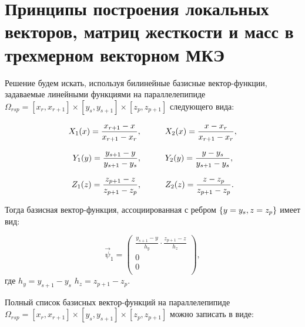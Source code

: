 \section{Принципы построения локальных векторов, матриц жесткости и масс в трехмерном векторном МКЭ}

Решение будем искать, используя билинейные базисные вектор-функции, задаваемые линейными функциями на параллелепипиде $\Omega_{rsp} = [x_r, x_{r+1}] \times [y_s, y_{s+1}] \times [z_p, z_{p+1}]$ следующего вида:

\begin{equation} \label{eq_1_12}
	X_1(x) = \frac{x_{r + 1} - x}{x_{r + 1} - x_r}, \hspace{10mm} X_2(x) = \frac{x - x_r}{x_{r + 1} - x_r},
\end{equation}

\begin{equation} \label{eq_1_13}
	Y_1(y) = \frac{y_{s + 1} - y}{y_{s + 1} - y_s}, \hspace{10mm} Y_2(y) = \frac{y - y_s}{y_{s + 1} - y_s},
\end{equation}

\begin{equation} \label{eq_1_14}
	Z_1(z) = \frac{z_{p + 1} - z}{z_{p + 1} - z_p}, \hspace{10mm} Z_2(z) = \frac{z - z_p}{z_{p + 1} - z_p}.
\end{equation}

Тогда базисная вектор-функция, ассоциированная с ребром $\{y = y_s,\\ z = z_p\}$ имеет вид:

\begin{equation*}
	\overrightarrow{\psi}_1 = \left(
	\begin{array}{c}
		\frac{y_{s + 1} - y}{h_y} \cdot \frac{z_{p + 1} - z}{h_z}\\
		0\\
		0\\
	\end{array}
	\right),
\end{equation*}
где $h_y = y_{s + 1} - y_s$ $h_z = z_{p + 1} - z_p$.

Полный список базисных вектор-функций на параллелепипиде $\Omega_{rsp} = [x_r, x_{r+1}] \times [y_s, y_{s+1}] \times [z_p, z_{p+1}]$ можно записать в виде:

